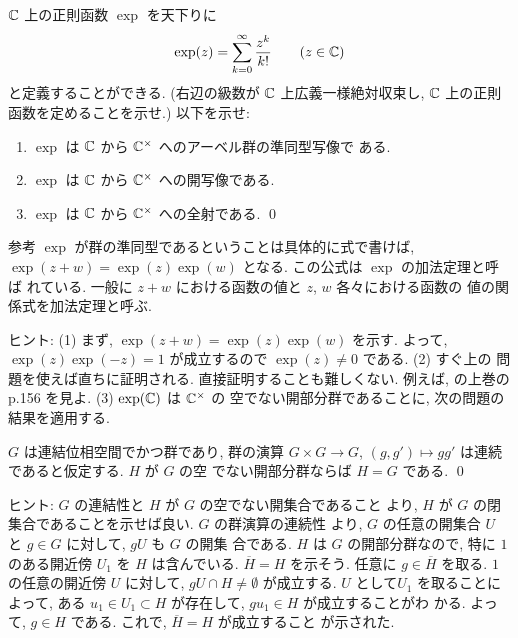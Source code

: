 \documentclass[12pt,twoside]{jarticle}
\def\C{{\Bbb C}} %
\begin{document}
\begin{question}\label{q:exp1}
  $\C$ 上の正則函数 $\exp$ を天下りに
  \[
    \exp(z) = \sum_{k=0}^\infty \frac{z^k}{k!}
    \qquad
    (z\in\C)
  \]
  と定義することができる. (右辺の級数が $\C$ 上広義一様絶対収束し,
  $\C$ 上の正則函数を定めることを示せ.) 以下を示せ:
  \begin{enumerate}
  \item $\exp$ は $\C$ から $\C^{\times}$ へのアーベル群の準同型写像で
    ある.
  \item $\exp$ は $\C$ から $\C^{\times}$ への開写像である.
  \item $\exp$ は $\C$ から $\C^{\times}$ への全射である.
    \qed
  \end{enumerate}
\end{question}

\noindent 参考 $\exp$ が群の準同型であるということは具体的に式で書けば, %
$\exp(z+w)=\exp(z)\exp(w)$ となる. この公式は $\exp$ の加法定理と呼ば
れている. 一般に $z+w$ における函数の値と $z$, $w$ 各々における函数の
値の関係式を加法定理と呼ぶ. 

\medskip

\noindent ヒント: (1) まず, $\exp(z+w)=\exp(z)\exp(w)$ を示す. よって,
$\exp(z)\exp(-z)=1$ が成立するので $\exp(z)\ne0$ である. (2) すぐ上の
問題を使えば直ちに証明される. 直接証明することも難しくない. 例えば,
\cite{Kazu} の上巻の p.156 を見よ. (3) $\exp(\C)$ は $\C^{\times}$ の
空でない開部分群であることに, 次の問題の結果を適用する. 

\begin{question}
  $G$ は連結位相空間でかつ群であり, 群の演算 $G\times G\to G$, %
  $(g,g')\mapsto gg'$ は連続であると仮定する. $H$ が $G$ の空
  でない開部分群ならば $H=G$ である. \qed
\end{question}

\noindent ヒント: $G$ の連結性と $H$ が $G$ の空でない開集合であること
より, $H$ が $G$ の閉集合であることを示せば良い. $G$ の群演算の連続性
より, $G$ の任意の開集合 $U$ と $g\in G$ に対して, $gU$ も $G$ の開集
合である. $H$ は $G$ の開部分群なので, 特に $1$ のある開近傍 $U_1$ を %
$H$ は含んでいる. $\overline{H}=H$ を示そう.  任意に %
$g\in\overline{H}$ を取る. $1$ の任意の開近傍 $U$ に対して, %
$gU\cap H\ne\emptyset$ が成立する. $U$ として$U_1$ を取ることによって, 
ある $u_1\in U_1\subset H$ が存在して, $gu_1\in H$ が成立することがわ
かる. よって, $g\in H$ である. これで, $\overline{H}=H$ が成立すること
が示された.

\medskip
\end{document}
